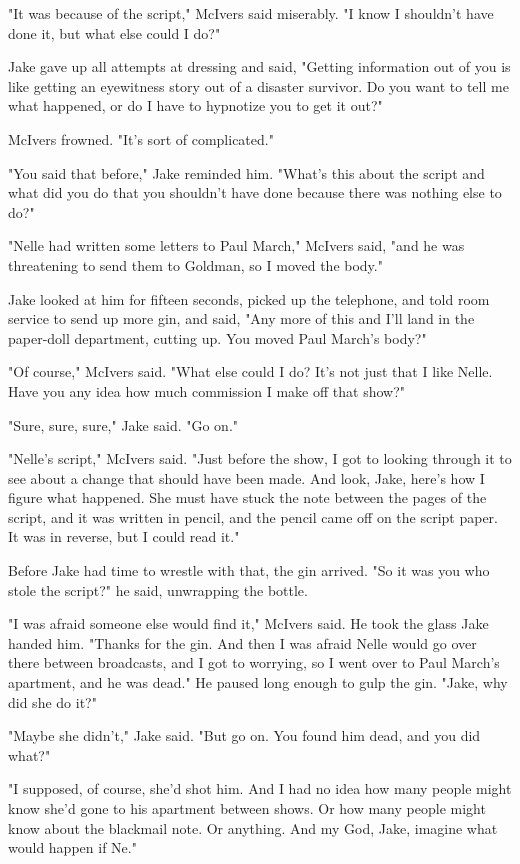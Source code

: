 \documentclass{novel}
\begin{document}
"It was because of the script," McIvers said miserably. "I know I shouldn't have done it, but what else could I do?"

Jake gave up all attempts at dressing and said, "Getting information out of you is like getting an eyewitness story out of a disaster survivor. Do you want to tell me what happened, or do I have to hypnotize you to get it out?"

McIvers frowned. "It's sort of complicated."

"You said that before," Jake reminded him. "What's this about the script and what did you do that you shouldn't have done because there was nothing else to do?"

"Nelle had written some letters to Paul March," McIvers said, "and he was threatening to send them to Goldman, so I moved the body."

Jake looked at him for fifteen seconds, picked up the telephone, and told room service to send up more gin, and said, "Any more of this and I'll land in the paper-doll department, cutting up. You moved Paul March's body?"

"Of course," McIvers said. "What else could I do? It's not just that I like Nelle. Have you any idea how much commission I make off that show?"

"Sure, sure, sure," Jake said. "Go on."

"Nelle's script," McIvers said. "Just before the show, I got to looking through it to see about a change that should have been made. And look, Jake, here's how I figure what happened. She must have stuck the note between the pages of the script, and it was written in pencil, and the pencil came off on the script paper. It was in reverse, but I could read it."

Before Jake had time to wrestle with that, the gin arrived. "So it was you who stole the script?" he said, unwrapping the bottle.

"I was afraid someone else would find it," McIvers said. He took the glass Jake handed him. "Thanks for the gin. And then I was afraid Nelle would go over there between broadcasts, and I got to worrying, so I went over to Paul March's apartment, and he was dead." He paused long enough to gulp the gin. "Jake, why did she do it?"

"Maybe she didn't," Jake said. "But go on. You found him dead, and you did what?"

"I supposed, of course, she'd shot him. And I had no idea how many people might know she'd gone to his apartment between shows. Or how many people might know about the blackmail note. Or anything. And my God, Jake, imagine what would happen if Ne."
\end{document}
